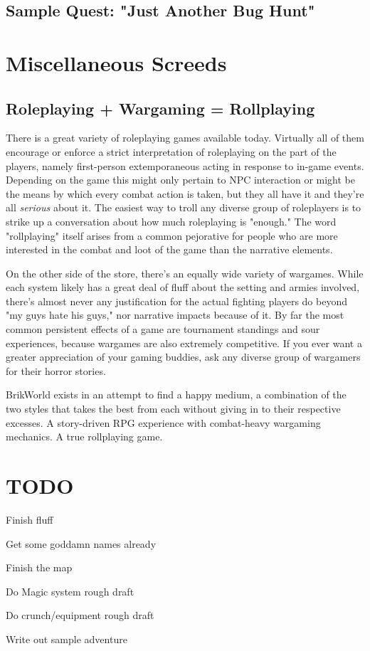 \documentclass[12pt,a4paper,twocolumn]{article}
\begin{document}
\subsection{Sample Quest: "Just Another Bug Hunt"}

\section{Miscellaneous Screeds}
\subsection{Roleplaying + Wargaming = Rollplaying}
There is a great variety of roleplaying games available today.  Virtually all of them encourage or enforce a strict interpretation of roleplaying on the part of the players, namely first-person extemporaneous acting in response to in-game events.  Depending on the game this might only pertain to NPC interaction or might be the means by which every combat action is taken, but they all have it and they're all {\em serious} about it.  The easiest way to troll any diverse group of roleplayers is to strike up a conversation about how much roleplaying is "enough."  The word "rollplaying" itself arises from a common pejorative for people who are more interested in the combat and loot of the game than the narrative elements.

On the other side of the store, there's an equally wide variety of wargames.  While each system likely has a great deal of fluff about the setting and armies involved, there's almost never any justification for the actual fighting players do beyond "my guys hate his guys," nor narrative impacts because of it.  By far the most common persistent effects of a game are tournament standings and sour experiences, because wargames are also extremely competitive.  If you ever want a greater appreciation of your gaming buddies, ask any diverse group of wargamers for their horror stories.

BrikWorld exists in an attempt to find a happy medium, a combination of the two styles that takes the best from each without giving in to their respective excesses.  A story-driven RPG experience with combat-heavy wargaming mechanics.  A true rollplaying game.

\section {TODO}

Finish fluff

Get some goddamn names already

Finish the map

Do Magic system rough draft

Do crunch/equipment rough draft

Write out sample adventure
\end{document}
